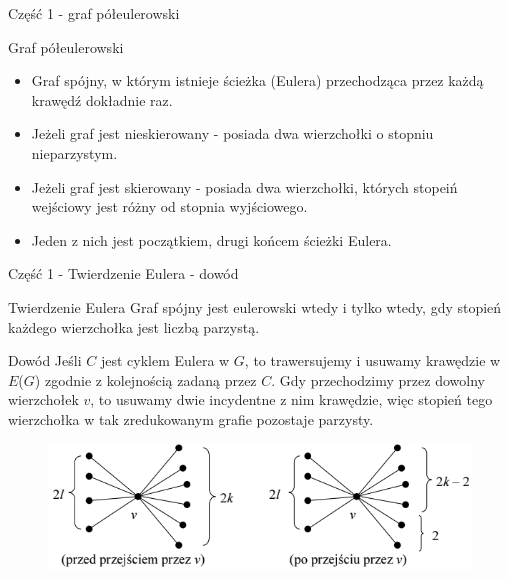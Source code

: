 \documentclass[polish,envcountsect,10pt]{beamer}
\begin{document}
\begin{frame}{Część 1 - graf półeulerowski}
    \begin{block}{Graf półeulerowski}
        \begin{itemize}
            \item Graf spójny, w którym istnieje ścieżka (Eulera) przechodząca przez każdą krawędź dokładnie raz.
            \item Jeżeli graf jest nieskierowany - posiada dwa wierzchołki o stopniu nieparzystym.
            \item Jeżeli graf jest skierowany - posiada dwa wierzchołki, których stopeiń wejściowy jest różny od stopnia wyjściowego.
            \item Jeden z nich jest początkiem, drugi końcem ścieżki Eulera.
        \end{itemize}
    \end{block}
    \begin{center}
    \end{center}
\end{frame}

\begin{frame}{Część 1 - Twierdzenie Eulera - dowód}
\begin{block}{Twierdzenie Eulera}
    Graf spójny jest eulerowski wtedy i tylko wtedy, gdy
    stopień każdego wierzchołka jest liczbą parzystą.
\end{block}
\begin{block}{Dowód}
    Jeśli $C$ jest cyklem Eulera w $G$, to trawersujemy i usuwamy
    krawędzie w $E$($G$) zgodnie z kolejnością zadaną przez $C$. Gdy przechodzimy
    przez dowolny wierzchołek $v$, to usuwamy dwie incydentne z nim krawędzie,
    więc stopień tego wierzchołka w tak zredukowanym grafie pozostaje
    parzysty.
\end{block}
\begin{figure}
    \centering
    \includegraphics[width=0.7\linewidth]{./zal_b.png}
\end{figure}
\end{frame}
\end{document}
